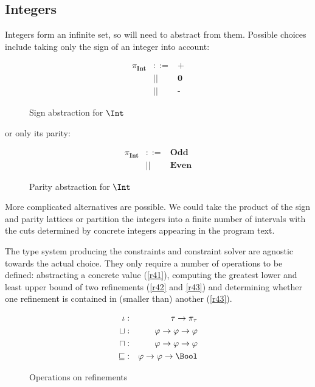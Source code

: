 \subsection{Integers}

Integers form an infinite set, so will need to abstract from them. Possible choices include taking only the sign of an integer into account:

\begin{figure}[h!t]
\begin{eqnarray*}
\pi_\mathbf{Int} &::=& \textbf{+} \\
                 &||&  \textbf{0} \\
                 &||&  \textbf{-}
\end{eqnarray*}
\caption{Sign abstraction for $\Int$}
\label{LatticeIntSign}
\end{figure}

or only its parity:

\begin{figure}[h!t]
\label{LatticeIntParity}
\begin{eqnarray*}
\pi_\mathbf{Int} &::=& \textbf{Odd}  \\
                 &||&  \textbf{Even}
\end{eqnarray*}
\caption{Parity abstraction for $\Int$}
\end{figure}

More complicated alternatives are possible. We could take the product of the sign and parity lattices or partition the integers into a finite number of intervals with the cuts determined by concrete integers appearing in the program text.

The type system producing the constraints and constraint solver are agnostic towards the actual choice. They only require a number of operations to be defined: abstracting a concrete value (\ref{r41}), computing the greatest lower and least upper bound of two refinements (\ref{r42} and \ref{r43}) and determining whether one refinement is contained in (smaller than) another (\ref{r43}).

\begin{figure}[h!t]
\begin{eqnarray}
\iota       &:& \tau \to \pi_\tau               \\ \label{r41}
\sqcup      &:& \varphi \to \varphi \to \varphi \\ \label{r42}
\sqcap      &:& \varphi \to \varphi \to \varphi \\ \label{r43}
\sqsubseteq &:& \varphi \to \varphi \to \Bool      \label{r44}
\end{eqnarray}
\caption{Operations on refinements}
\label{LatticeOperations}
\end{figure}

